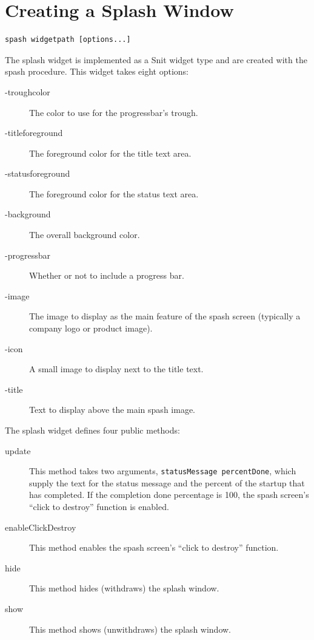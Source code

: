 \section{Creating a Splash Window}
\begin{lstlisting}[caption={Snit spash widget creation},
		   label={lst:SPL:spashWidget}]
spash widgetpath [options...]
\end{lstlisting}
The splash widget is implemented as a Snit widget type and are created
with the spash procedure.  This widget takes eight options:
\begin{description}
\item[-troughcolor] The color to use for the progressbar's trough.
\item[-titleforeground] The foreground color for the title text area.
\item[-statusforeground] The foreground color for the status text area.
\item[-background] The overall background color.
\item[-progressbar] Whether or not to include a progress bar.
\item[-image] The image to display as the main feature of the spash
screen (typically a company logo or product image).
\item[-icon] A small image to display next to the title text.
\item[-title] Text to display above the main spash image.
\end{description}
The splash widget defines four public methods:
\begin{description}
\item[update] This method takes two arguments, 
\lstinline=statusMessage percentDone=, which supply the text for the
status message and the percent of the startup that has completed.  If
the completion done percentage is 100, the spash screen's ``click to
destroy'' function is enabled.
\item[enableClickDestroy] This method enables the spash screen's ``click
to destroy'' function.
\item[hide] This method hides (withdraws) the splash window.
\item[show] This method shows (unwithdraws) the splash window.
\end{description}

